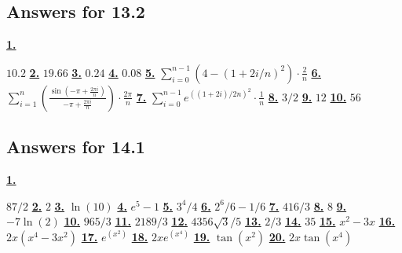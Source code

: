 \subsection *{Answers for 13.2}
\hypertarget {a:13.2.1}{\hyperlink {e:13.2.1}{\bfseries 1.}} \mdseries $10.2$\qquad 
\hypertarget {a:13.2.2}{\hyperlink {e:13.2.2}{\bfseries 2.}} \mdseries $19.66$\qquad 
\hypertarget {a:13.2.3}{\hyperlink {e:13.2.3}{\bfseries 3.}} \mdseries $0.24$\qquad 
\hypertarget {a:13.2.4}{\hyperlink {e:13.2.4}{\bfseries 4.}} \mdseries $0.08$\qquad 
\hypertarget {a:13.2.5}{\hyperlink {e:13.2.5}{\bfseries 5.}} \mdseries $\sum _{i=0}^{n-1} \left ( 4 - (1+2i/n)^2\right )\cdot \frac {2}{n}$\qquad 
\hypertarget {a:13.2.6}{\hyperlink {e:13.2.6}{\bfseries 6.}} \mdseries $\sum _{i=1}^{n} \left (\frac {\sin \left (-\pi + \frac {2\pi i}{n}\right )}{-\pi + \frac {2\pi i}{n}}\right )\cdot \frac {2\pi }{n}$\qquad 
\hypertarget {a:13.2.7}{\hyperlink {e:13.2.7}{\bfseries 7.}} \mdseries $\sum _{i=0}^{n-1} e^{((1+2i)/2n)^2} \cdot \frac {1}{n}$\qquad 
\hypertarget {a:13.2.8}{\hyperlink {e:13.2.8}{\bfseries 8.}} \mdseries $3/2$\qquad 
\hypertarget {a:13.2.9}{\hyperlink {e:13.2.9}{\bfseries 9.}} \mdseries $12$\qquad 
\hypertarget {a:13.2.10}{\hyperlink {e:13.2.10}{\bfseries 10.}} \mdseries $56$\qquad 
\subsection *{Answers for 14.1}
\hypertarget {a:14.1.1}{\hyperlink {e:14.1.1}{\bfseries 1.}} \mdseries $87/2$\qquad 
\hypertarget {a:14.1.2}{\hyperlink {e:14.1.2}{\bfseries 2.}} \mdseries $2$\qquad 
\hypertarget {a:14.1.3}{\hyperlink {e:14.1.3}{\bfseries 3.}} \mdseries $\ln (10)$\qquad 
\hypertarget {a:14.1.4}{\hyperlink {e:14.1.4}{\bfseries 4.}} \mdseries $e^5-1$\qquad 
\hypertarget {a:14.1.5}{\hyperlink {e:14.1.5}{\bfseries 5.}} \mdseries $3^4/4$\qquad 
\hypertarget {a:14.1.6}{\hyperlink {e:14.1.6}{\bfseries 6.}} \mdseries $2^6/6 -1/6$\qquad 
\hypertarget {a:14.1.7}{\hyperlink {e:14.1.7}{\bfseries 7.}} \mdseries $416/3$\qquad 
\hypertarget {a:14.1.8}{\hyperlink {e:14.1.8}{\bfseries 8.}} \mdseries $8$\qquad 
\hypertarget {a:14.1.9}{\hyperlink {e:14.1.9}{\bfseries 9.}} \mdseries $-7\ln (2)$\qquad 
\hypertarget {a:14.1.10}{\hyperlink {e:14.1.10}{\bfseries 10.}} \mdseries $965/3$\qquad 
\hypertarget {a:14.1.11}{\hyperlink {e:14.1.11}{\bfseries 11.}} \mdseries $2189/3$\qquad 
\hypertarget {a:14.1.12}{\hyperlink {e:14.1.12}{\bfseries 12.}} \mdseries $4356 \sqrt {3}/5$\qquad 
\hypertarget {a:14.1.13}{\hyperlink {e:14.1.13}{\bfseries 13.}} \mdseries $2/3$\qquad 
\hypertarget {a:14.1.14}{\hyperlink {e:14.1.14}{\bfseries 14.}} \mdseries $35$\qquad 
\hypertarget {a:14.1.15}{\hyperlink {e:14.1.15}{\bfseries 15.}} \mdseries $x^2-3x$\qquad 
\hypertarget {a:14.1.16}{\hyperlink {e:14.1.16}{\bfseries 16.}} \mdseries $2x(x^4-3x^2)$\qquad 
\hypertarget {a:14.1.17}{\hyperlink {e:14.1.17}{\bfseries 17.}} \mdseries $e^{\left (x^2\right )}$\qquad 
\hypertarget {a:14.1.18}{\hyperlink {e:14.1.18}{\bfseries 18.}} \mdseries $2xe^{\left (x^4\right )}$\qquad 
\hypertarget {a:14.1.19}{\hyperlink {e:14.1.19}{\bfseries 19.}} \mdseries $\tan (x^2)$\qquad 
\hypertarget {a:14.1.20}{\hyperlink {e:14.1.20}{\bfseries 20.}} \mdseries $2x\tan (x^4)$\qquad 
